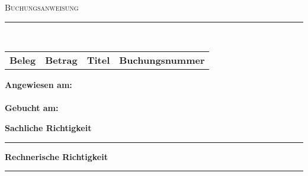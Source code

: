 \documentclass[a4paper,11pt]{article}
\newcommand{\linia}{\rule{\linewidth}{0.5pt}}
\newcommand{\mysection}[1]{
	\begin{center}
	{\large \textsc{#1}}
	\vspace*{-0.5cm}
	\\\linia\\
	\vspace*{-0.5cm}
	\end{center}
}
\theoremstyle{mytheor}
\begin{document}
\mysection{Buchungsanweisung}

\begin{center}
\begin{tabular}{rrrr}
\textbf{Beleg} & \textbf{Betrag} & \textbf{Titel} & \textbf{Buchungsnummer}\\ %
\end{tabular}
\end{center}
\vspace{1cm}
\textbf{Angewiesen am:}\\\\ %
\textbf{Gebucht am:}\\ %

\vspace{0,5cm}
\parbox[b]{0.4\linewidth}{%
	\strut 
	\textbf{Sachliche Richtigkeit} \\[1.25cm]%
	\hrule
	\vspace{0.25cm}
} 
\hspace{1cm} %
\parbox[b]{0.4\linewidth}{%
	\strut 
	\textbf{Rechnerische Richtigkeit} \\[1.25cm]%
	\hrule 
	\vspace{0.25cm}
}
\end{document}
